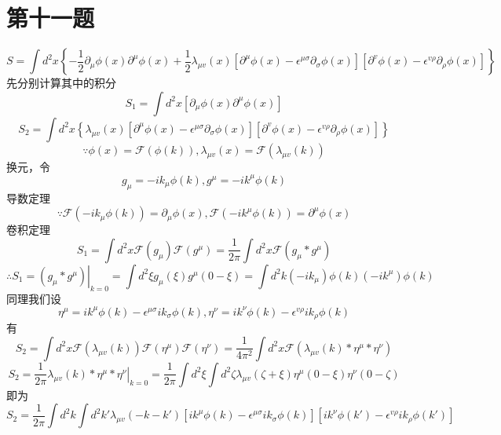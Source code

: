 \documentclass[a4paper]{ctexart}
\begin{document}
\section{第十一题}
$$
    S=\int{d}^2x\left\{ -\frac{1}{2}\partial _{\mu}\phi \left( x \right) \partial ^{\mu}\phi \left( x \right) +\frac{1}{2}\lambda _{\mu v}\left( x \right) \left[ \partial ^{\mu}\phi \left( x \right) -\epsilon ^{\mu \sigma}\partial _{\sigma}\phi \left( x \right) \right] \left[ \partial ^v\phi \left( x \right) -\epsilon ^{v\rho}\partial _{\rho}\phi \left( x \right) \right] \right\}
$$
先分别计算其中的积分
$$
    S_1=\int{d}^2x\left[ \partial _{\mu}\phi \left( x \right) \partial ^{\mu}\phi \left( x \right) \right]
$$
$$
    S_2=\int{d}^2x\left\{ \lambda _{\mu v}\left( x \right) \left[ \partial ^{\mu}\phi \left( x \right) -\epsilon ^{\mu \sigma}\partial _{\sigma}\phi \left( x \right) \right] \left[ \partial ^v\phi \left( x \right) -\epsilon ^{v\rho}\partial _{\rho}\phi \left( x \right) \right] \right\}
$$
$$
    \because \phi \left( x \right) =\mathcal{F}\left( \phi \left( k \right) \right) ,\lambda _{\mu v}\left( x \right) =\mathcal{F}\left( \lambda _{\mu v}\left( k \right) \right)
$$
换元，令
$$
    g_{\mu}=-ik_{\mu}\phi \left( k \right) ,g^{\mu}=-ik^{\mu}\phi \left( k \right)
$$
导数定理
$$
    \because \mathcal{F}\left( -ik_{\mu}\phi \left( k \right) \right) =\partial _{\mu}\phi \left( x \right) ,\mathcal{F}\left( -ik^{\mu}\phi \left( k \right) \right) =\partial ^{\mu}\phi \left( x \right)
$$
卷积定理
$$
    S_1=\int{d}^2x\mathcal{F}\left( g_{\mu} \right) \mathcal{F}\left( g^{\mu} \right) =\frac{1}{2\pi}\int{d}^2x\mathcal{F}\left( g_{\mu}*g^{\mu} \right)
$$
$$
    \therefore S_1=\left. \left( g_{\mu}*g^{\mu} \right) \right|_{k=0}=\int{d}^2\xi g_{\mu}\left( \xi \right) g^{\mu}\left( 0-\xi \right) =\int{d}^2k\left( -ik_{\mu} \right) \phi \left( k \right) \left( -ik^{\mu} \right) \phi \left( k \right)
$$
同理我们设
$$
    \eta ^{\mu}=ik^{\mu}\phi \left( k \right) -\epsilon ^{\mu \sigma}ik_{\sigma}\phi \left( k \right) ,\eta ^{\nu}=ik^{\nu}\phi \left( k \right) -\epsilon ^{v\rho}ik_{\rho}\phi \left( k \right)
$$
有
$$
    S_2=\int{d}^2x\mathcal{F}\left( \lambda _{\mu v}\left( k \right) \right) \mathcal{F}\left( \eta ^{\mu} \right) \mathcal{F}\left( \eta ^{\nu} \right) =\frac{1}{4\pi ^2}\int{d}^2x\mathcal{F}\left( \lambda _{\mu v}\left( k \right) *\eta ^{\mu}*\eta ^{\nu} \right)
$$
$$
    S_2=\frac{1}{2\pi}\left. \lambda _{\mu v}\left( k \right) *\eta ^{\mu}*\eta ^{\nu} \right|_{k=0}=\frac{1}{2\pi}\int{d}^2\xi \int{d}^2\zeta \lambda _{\mu v}\left( \zeta +\xi \right) \eta ^{\mu}\left( 0-\xi \right) \eta ^{\nu}\left( 0-\zeta \right)
$$
即为
$$
    S_2=\frac{1}{2\pi}\int{d}^2k\int{d}^2k'\lambda _{\mu v}\left( -k-k' \right) \left[ ik^{\mu}\phi \left( k \right) -\epsilon ^{\mu \sigma}ik_{\sigma}\phi \left( k \right) \right] \left[ ik^{\nu}\phi \left( k' \right) -\epsilon ^{v\rho}ik_{\rho}\phi \left( k' \right) \right]
$$
\end{document}
